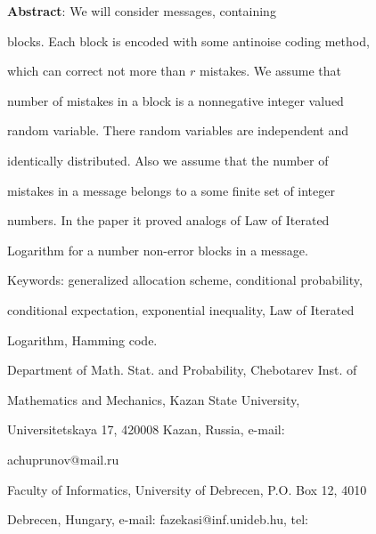 \documentclass{article}
\begin{document}
{\small{\bf Abstract}: We will consider  messages,  containing


blocks. Each block is encoded with some antinoise coding method,


which can correct not more than $r$ mistakes. We assume that


number of mistakes  in a block  is a nonnegative integer valued


random variable. There random variables are independent  and


identically distributed. Also we assume  that the number of


mistakes in a message belongs to a some finite set of integer


numbers. In the paper it proved analogs of Law of Iterated


Logarithm for a number non-error blocks in a message.





}





\smallskip








Keywords: generalized allocation scheme, conditional probability,


conditional expectation, exponential inequality, Law of Iterated


Logarithm, Hamming code.











\bigskip


 Department of Math. Stat. and Probability, Chebotarev Inst. of


Mathematics and Mechanics, Kazan State University,


Universitetskaya 17, 420008 Kazan, Russia, e-mail:


achuprunov@mail.ru





\bigskip








Faculty of Informatics, University of Debrecen,  P.O. Box 12, 4010


Debrecen, Hungary, e-mail: fazekasi@inf.unideb.hu, tel:
\end{document}
